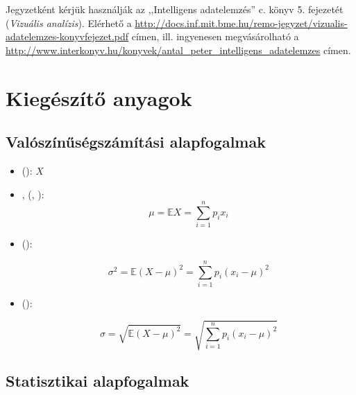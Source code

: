 

Jegyzetként kérjük használják az ,,Intelligens adatelemzés'' c. könyv 5. fejezetét (\emph{Vizuális analízis}). Elérhető a \url{http://docs.inf.mit.bme.hu/remo-jegyzet/vizualis-adatelemzes-konyvfejezet.pdf} címen, ill. ingyenesen megvásárolható a \url{http://www.interkonyv.hu/konyvek/antal_peter_intelligens_adatelemzes} címen.

\section{Kiegészítő anyagok\kieg}

\subsection{Valószínűségszámítási alapfogalmak}

\begin{definicio}
	\begin{itemize}
		\item {} (): $X$
		\item {},  (, ):
		$$\mu = \mathbb{E}X = \sum_{i=1}^{n} p_i x_i$$

		\item {} ():

		$$\sigma^2 = \mathbb{E}\left(X-\mu\right)^2 = \sum_{i=1}^{n} p_i (x_i - \mu)^2$$

		\item {} ():

		$$\sigma = \sqrt{\mathbb{E}\left(X-\mu\right)^2} = \sqrt{\sum_{i=1}^{n} p_i (x_i - \mu)^2}$$
	\end{itemize}
\end{definicio}

\subsection{Statisztikai alapfogalmak}

